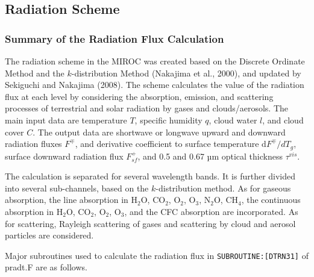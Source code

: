 \hypertarget{radiation-scheme}{%
\subsection{Radiation Scheme}\label{radiation-scheme}}

\hypertarget{summary-of-the-radiation-flux-calculation}{%
\subsubsection{Summary of the Radiation Flux Calculation}\label{summary-of-the-radiation-flux-calculation}}

The radiation scheme in the MIROC was created based on the Discrete Ordinate Method and the \(k\)-distribution Method (Nakajima et al., 2000), and updated by Sekiguchi and Nakajima (2008). The scheme
calculates the value of the radiation flux at each level by considering the absorption, emission, and scattering processes of terrestrial and solar radiation by gases and clouds/aerosols. The main
input data are temperature \(T\), specific humidity \(q\), cloud water \(l\), and cloud cover \(C\). The output data are shortwave or longwave upward and downward radiation fluxes \(F^{\mp}\), and
derivative coefficient to surface temperature \(\mathrm{d}F^{\mp}/dT_{g}\), surface downward radiation flux \(F_{sf}^{+}\), and 0.5 and 0.67 µm optical thickness \(\tau^{vis}\).

The calculation is separated for several wavelength bands. It is further divided into several sub-channels, based on the \(k\)-distribution method. As for gaseous absorption, the line absorption in
\(\mathrm{H_2O}\), \(\mathrm{CO_2}\), \(\mathrm{O_2}\), \(\mathrm{O_3}\), \(\mathrm{N_2} \mathrm{O}\), \(\mathrm{CH_4}\), the continuous absorption in \(\mathrm{H_2} \mathrm{O}\), \(\mathrm{CO_2}\),
\(\mathrm{O_2}\), \(\mathrm{O_3}\), and the CFC absorption are incorporated. As for scattering, Rayleigh scattering of gases and scattering by cloud and aerosol particles are considered.

Major subroutines used to calculate the radiation flux in \texttt{SUBROUTINE:{[}DTRN31{]}} of pradt.F are as follows.

